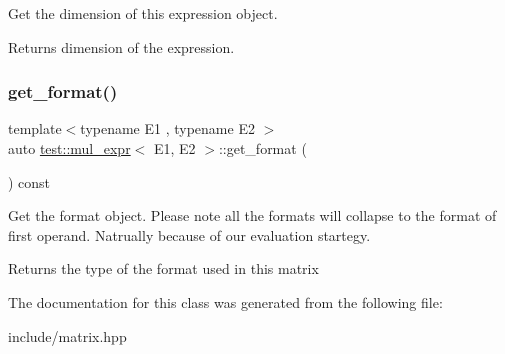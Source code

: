 Get the dimension of this expression object. 

\begin{DoxyReturn}{Returns}
dimension of the expression. 
\end{DoxyReturn}
\mbox{\label{classtest_1_1mul__expr_a927a3ccb592d38d0d36d882ffbae3318}} 
\subsubsection{\texorpdfstring{get\_format()}{get\_format()}}
{\footnotesize\ttfamily template$<$typename E1 , typename E2 $>$ \\
auto \mbox{\hyperlink{classtest_1_1mul__expr}{test\+::mul\+\_\+expr}}$<$ E1, E2 $>$\+::get\+\_\+format (\begin{DoxyParamCaption}{ }\end{DoxyParamCaption}) const\hspace{0.3cm}{\ttfamily [inline]}}



Get the format object. Please note all the formats will collapse to the format of first operand. Natrually because of our evaluation startegy. 

\begin{DoxyReturn}{Returns}
the type of the format used in this matrix 
\end{DoxyReturn}


The documentation for this class was generated from the following file\+:\begin{DoxyCompactItemize}
\item 
include/matrix.\+hpp\end{DoxyCompactItemize}
